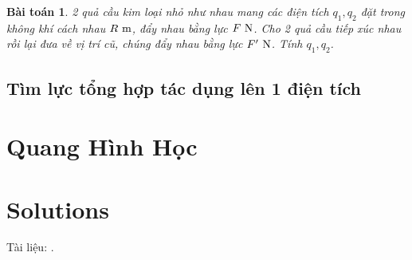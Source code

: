 \documentclass{article}
\numberwithin{equation}{section}
\newtheorem{baitoan}{Bài toán}[section]
\begin{document}
\begin{baitoan}
	2 quả cầu kim loại nhỏ như nhau mang các điện tích $q_1,q_2$ đặt trong không khí cách nhau $R\ {\rm m}$, đẩy nhau bằng lực $F\ {\rm N}$. Cho 2 quả cầu tiếp xúc nhau rồi lại đưa về vị trí cũ, chúng đẩy nhau bằng lực $F'\ {\rm N}$. Tính $q_1,q_2$.
\end{baitoan}

\subsection{Tìm lực tổng hợp tác dụng lên 1 điện tích}


\section{Quang Hình Học}


\section{Solutions}

Tài liệu: \cite{SGK_Hoa_Hoc_11_co_ban, SGK_Hoa_Hoc_11_nang_cao}.

\printbibliography[heading=bibintoc]
	
\end{document}
